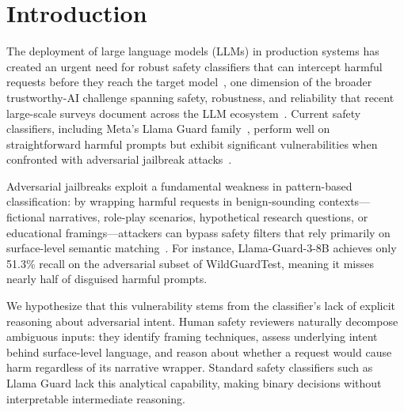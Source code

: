 \documentclass[superintelligence,article,submit,pdftex,moreauthors]{Definitions/mdpi}
\begin{document}

\section{Introduction}

The deployment of large language models (LLMs) in production systems has created an urgent need for robust safety classifiers that can intercept harmful requests before they reach the target model~\citep{inan2023llamaguard, han2024wildguard}, one dimension of the broader trustworthy-AI challenge spanning safety, robustness, and reliability that recent large-scale surveys document across the LLM ecosystem~\citep{sun2024trustllm}. Current safety classifiers, including Meta's Llama Guard family~\citep{inan2023llamaguard, metallamaguard3}, perform well on straightforward harmful prompts but exhibit significant vulnerabilities when confronted with adversarial jailbreak attacks~\citep{chao2023jailbreaking, zou2023universal, liu2024autodan}.

Adversarial jailbreaks exploit a fundamental weakness in pattern-based classification: by wrapping harmful requests in benign-sounding contexts---fictional narratives, role-play scenarios, hypothetical research questions, or educational framings---attackers can bypass safety filters that rely primarily on surface-level semantic matching~\citep{wei2024jailbroken}. For instance, Llama-Guard-3-8B achieves only 51.3\% recall on the adversarial subset of WildGuardTest, meaning it misses nearly half of disguised harmful prompts.

We hypothesize that this vulnerability stems from the classifier's lack of explicit reasoning about adversarial intent. Human safety reviewers naturally decompose ambiguous inputs: they identify framing techniques, assess underlying intent behind surface-level language, and reason about whether a request would cause harm regardless of its narrative wrapper. Standard safety classifiers such as Llama Guard lack this analytical capability, making binary decisions without interpretable intermediate reasoning.
\end{document}
